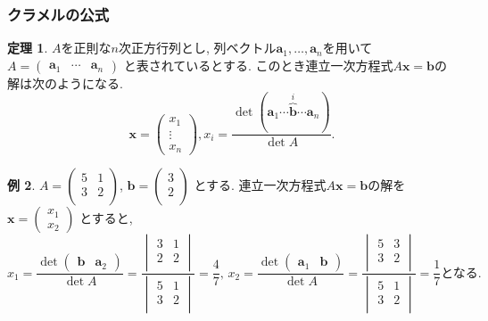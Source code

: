 \documentclass[dvipdfmx,a4paper,11pt]{article}
\theoremstyle{definition}
\newtheorem{thm}{定理}
\newtheorem{exa}[thm]{例}
\begin{document}
\subsubsection{クラメルの公式}

\begin{tcolorbox}[
    colback = white,
    colframe = green!35!black,
    fonttitle = \bfseries,
    breakable = true]
    \begin{thm}
$A$を正則な$n$次正方行列とし, 列ベクトル$\bm{a}_1, \ldots, \bm{a}_{n}$を用いて
$
A = 
\begin{pmatrix}
\bm{a}_1 & \cdots & \bm{a}_{n}
\end{pmatrix}
$
と表されているとする.
このとき連立一次方程式$A \bm{x} =\bm{b}$の解は次のようになる.
$$
\bm{x}= \begin{pmatrix}
x_1 \\ \vdots \\ x_{n}
\end{pmatrix}, 
x_i = \frac{\det
(\bm{a}_1 \cdots \overbrace{\bm{b}}^{i} \cdots   \bm{a}_{n}
)
}{\det A}.
$$
    \end{thm}
 \end{tcolorbox}
\begin{exa}
$
A = 
\begin{pmatrix}
5 &1\\
3&2 \\ 
\end{pmatrix}
$, $
\bm{b} = 
\begin{pmatrix}
3\\
2 \\ 
\end{pmatrix}
$
とする. 
連立一次方程式$A \bm{x} =\bm{b}$の解を
$
\bm{x}= \begin{pmatrix}
x_1 \\x_2
\end{pmatrix} 
$
とすると,
$$
x_1 = \frac{\det
\begin{pmatrix}
 \bm{b}& \bm{a}_{2}
\end{pmatrix}
}{\det A}
= 
\frac{ 
\begin{vmatrix}
3&1\\
2&2 \\
\end{vmatrix}
}
{
\begin{vmatrix}
5&1\\
3&2 \\
\end{vmatrix}
}
=\frac{4}{7} 
\text{, }
x_2 = \frac{\det
\begin{pmatrix}
\bm{a}_{1}& \bm{b}
\end{pmatrix}
}{\det A}
= 
\frac{ 
\begin{vmatrix}
5&3\\
3&2 \\
\end{vmatrix}
}
{
\begin{vmatrix}
5&1\\
3&2 \\
\end{vmatrix}
}
=\frac{1}{7}
\text{となる.}
$$
\end{exa}
\end{document}
